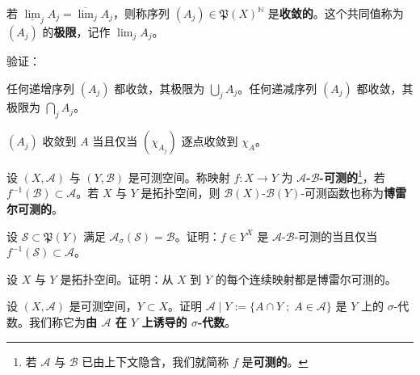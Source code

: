 \begin{exercises}
\begin{items}
\end{items}

\item

若 $ \underline{\lim}_j A_j=\overline{\lim}_j A_j $，则称序列 $ (A_j)\in\mathfrak{P}(X)^{\mathbb{N}} $ 是\textbf{收敛的}。这个共同值称为 $ (A_j) $ 的\textbf{极限}，记作 $ \lim_j A_j $。

验证：

\begin{items}
\item

任何递增序列 $ (A_j) $ 都收敛，其极限为 $ \bigcup_j A_j $。任何递减序列 $ (A_j) $ 都收敛，其极限为 $ \bigcap_j A_j $。

\item

$ (A_j) $ 收敛到 $ A $ 当且仅当 $ (\chi_{A_j}) $ 逐点收敛到 $ \chi_A $。

\end{items}

\item

设 $ (X,\mathcal{A}) $ 与 $ (Y,\mathcal{B}) $ 是可测空间。称映射 $ f:X\to Y $ 为 \textbf{$ \mathcal{A} $-$ \mathcal{B} $-可测的}\footnote{若 $ \mathcal{A} $ 与 $ \mathcal{B} $ 已由上下文隐含，我们就简称 $ f $ 是\textbf{可测的}。}，若 $ f^{-1}(\mathcal{B})\subset\mathcal{A} $。若 $ X $ 与 $ Y $ 是拓扑空间，则 $ \mathcal{B}(X) $-$ \mathcal{B}(Y) $-可测函数也称为\textbf{博雷尔可测的}。

\begin{items}
\item

设 $ \mathcal{S}\subset\mathfrak{P}(Y) $ 满足 $ \mathcal{A}_\sigma(\mathcal{S})=\mathcal{B} $。证明：$ f\in Y^X $ 是 $ \mathcal{A} $-$ \mathcal{B} $-可测的当且仅当 $ f^{-1}(\mathcal{S})\subset\mathcal{A} $。

\item

设 $ X $ 与 $ Y $ 是拓扑空间。证明：从 $ X $ 到 $ Y $ 的每个连续映射都是博雷尔可测的。

\end{items}

\item

设 $ (X,\mathcal{A}) $ 是可测空间，$ Y\subset X $。证明 $ \mathcal{A}\mid Y := \{ A\cap Y \;;\; A\in\mathcal{A} \} $ 是 $ Y $ 上的 $ \sigma $-代数。我们称它为\textbf{由 $ \mathcal{A} $ 在 $ Y $ 上诱导的 $ \sigma $-代数}。


\end{exercises}
